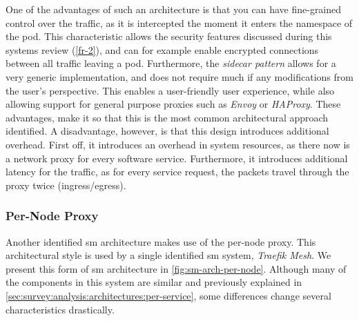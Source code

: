 One of the advantages of such an architecture is that you can have fine-grained control over the traffic, as it is intercepted the moment it enters the namespace of the \gls{pod}. This characteristic allows the security features discussed during this systems review (\ref{fr-2}), and can for example enable encrypted connections between all traffic leaving a \gls{pod}. Furthermore, the \textit{sidecar pattern} allows for a very generic implementation, and does not require much if any modifications from the user's perspective. This enables a user-friendly user experience, while also allowing support for general purpose proxies such as \textit{Envoy} or \textit{HAProxy}. These advantages, make it so that this is the most common architectural approach identified. A disadvantage, however, is that this design introduces additional overhead. First off, it introduces an overhead in system resources, as there now is a network proxy for every software service. Furthermore, it introduces additional latency for the traffic, as for every service request, the packets travel through the proxy twice (ingress/egress).


\subsubsection{Per-Node Proxy}
\label{sec:survey:analysis:architectures:per-node}

Another identified \gls{sm} architecture makes use of the per-node proxy. This architectural style is used by a single identified \gls{sm} system, \textit{Traefik Mesh}. We present this form of \gls{sm} architecture in \cref{fig:sm-arch-per-node}. Although many of the components in this system are similar and previously explained in \cref{sec:survey:analysis:architectures:per-service}, some differences change several characteristics drastically.

